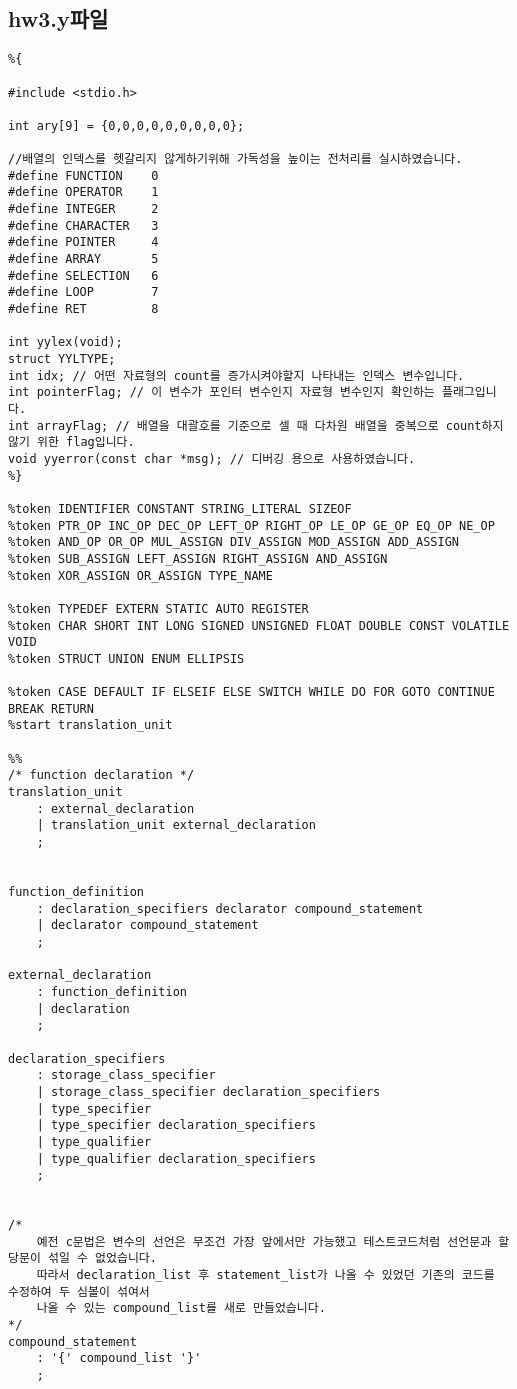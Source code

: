 \documentclass[11pt,oneside,a4paper]{article}
\begin{document}
\subsection{hw3.y파일}
\begin{verbatim} 
%{

#include <stdio.h>

int ary[9] = {0,0,0,0,0,0,0,0,0};

//배열의 인덱스를 헷갈리지 않게하기위해 가독성을 높이는 전처리를 실시하였습니다.
#define	FUNCTION	0
#define OPERATOR	1
#define INTEGER		2
#define CHARACTER	3
#define POINTER		4
#define ARRAY		5
#define SELECTION	6
#define LOOP		7
#define RET			8

int yylex(void);
struct YYLTYPE;
int idx; // 어떤 자료형의 count를 증가시켜야할지 나타내는 인덱스 변수입니다.
int pointerFlag; // 이 변수가 포인터 변수인지 자료형 변수인지 확인하는 플래그입니다.
int arrayFlag; // 배열을 대괄호를 기준으로 셀 때 다차원 배열을 중복으로 count하지 않기 위한 flag입니다.
void yyerror(const char *msg); // 디버깅 용으로 사용하였습니다.
%}

%token IDENTIFIER CONSTANT STRING_LITERAL SIZEOF
%token PTR_OP INC_OP DEC_OP LEFT_OP RIGHT_OP LE_OP GE_OP EQ_OP NE_OP
%token AND_OP OR_OP MUL_ASSIGN DIV_ASSIGN MOD_ASSIGN ADD_ASSIGN
%token SUB_ASSIGN LEFT_ASSIGN RIGHT_ASSIGN AND_ASSIGN
%token XOR_ASSIGN OR_ASSIGN TYPE_NAME

%token TYPEDEF EXTERN STATIC AUTO REGISTER
%token CHAR SHORT INT LONG SIGNED UNSIGNED FLOAT DOUBLE CONST VOLATILE VOID
%token STRUCT UNION ENUM ELLIPSIS

%token CASE DEFAULT IF ELSEIF ELSE SWITCH WHILE DO FOR GOTO CONTINUE BREAK RETURN
%start translation_unit

%%
/* function declaration */
translation_unit
	: external_declaration
	| translation_unit external_declaration
	;


function_definition
	: declaration_specifiers declarator compound_statement
	| declarator compound_statement
	;

external_declaration
	: function_definition
	| declaration
	;

declaration_specifiers
	: storage_class_specifier
	| storage_class_specifier declaration_specifiers 
	| type_specifier
	| type_specifier declaration_specifiers
	| type_qualifier 
	| type_qualifier declaration_specifiers
	;


/*
	예전 c문법은 변수의 선언은 무조건 가장 앞에서만 가능했고 테스트코드처럼 선언문과 할당문이 섞일 수 없었습니다. 
	따라서 declaration_list 후 statement_list가 나올 수 있었던 기존의 코드를 수정하여 두 심볼이 섞여서
	나올 수 있는 compound_list를 새로 만들었습니다.
*/
compound_statement 
	: '{' compound_list '}'
	;


\end{verbatim}
\end{document}
